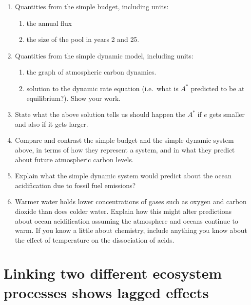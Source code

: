 \documentclass[
  letterpaper,
  DIV=11,
  numbers=noendperiod]{scrreprt}
\providecommand{\tightlist}{%
  \setlength{\itemsep}{0pt}\setlength{\parskip}{0pt}}
\begin{document}
\begin{enumerate}
\def\labelenumi{\arabic{enumi}.}
\tightlist
\item
  Quantities from the simple budget, including units:

  \begin{enumerate}
  \def\labelenumii{\alph{enumii}.}
  \tightlist
  \item
    the annual flux
  \item
    the size of the pool in years 2 and 25.
  \end{enumerate}
\item
  Quantities from the simple dynamic model, including units:

  \begin{enumerate}
  \def\labelenumii{\alph{enumii}.}
  \tightlist
  \item
    the graph of atmospheric carbon dynamics.
  \item
    solution to the dynamic rate equation (i.e.~what is \(A^*\)
    predicted to be at equilibrium?). Show your work.
  \end{enumerate}
\item
  State what the above solution tells us should happen the \(A^*\) if
  \(e\) gets smaller and also if it gets larger.
\item
  Compare and contrast the simple budget and the simple dynamic system
  above, in terms of how they represent a system, and in what they
  predict about future atmospheric carbon levels.
\item
  Explain what the simple dynamic system would predict about the ocean
  acidification due to fossil fuel emissions?
\item
  Warmer water holds lower concentrations of gases such as oxygen and
  carbon dioxide than does colder water. Explain how this might alter
  predictions about ocean acidification assuming the atmosphere and
  oceans continue to warm. If you know a little about chemistry, include
  anything you know about the effect of temperature on the dissociation
  of acids.
\end{enumerate}

\section{Linking two different ecosystem processes shows lagged
effects}\label{linking-two-different-ecosystem-processes-shows-lagged-effects}
\end{document}
